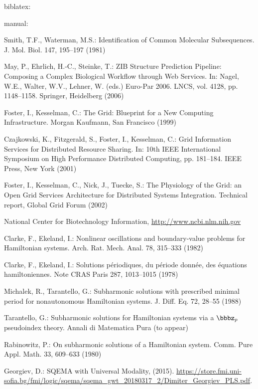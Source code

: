 \documentclass{llncs}
\begin{document}
\nocite{*} biblatex:
\printbibliography

\newpage
manual:
\begin{thebibliography}{10}
Smith, T.F., Waterman, M.S.:
Identification of Common Molecular Subsequences.
J. Mol. Biol. 147, 195--197 (1981)

May, P., Ehrlich, H.-C., Steinke, T.:
ZIB Structure Prediction Pipeline: Composing a Complex Biological Workflow through Web Services.
In: Nagel, W.E., Walter, W.V., Lehner, W. (eds.) Euro-Par 2006.
LNCS, vol. 4128, pp. 1148--1158. Springer, Heidelberg (2006)

Foster, I., Kesselman, C.:
The Grid: Blueprint for a New Computing Infrastructure.
Morgan Kaufmann, San Francisco (1999)

Czajkowski, K., Fitzgerald, S., Foster, I., Kesselman, C.:
Grid Information Services for Distributed Resource Sharing.
In: 10th IEEE International Symposium on High Performance Distributed Computing,
pp. 181--184. IEEE Press, New York (2001)

Foster, I., Kesselman, C., Nick, J., Tuecke, S.:
The Physiology of the Grid:
an Open Grid Services Architecture for Distributed Systems Integration.
Technical report, Global Grid Forum (2002)

National Center for Biotechnology Information,
\url{http://www.ncbi.nlm.nih.gov}

Clarke, F., Ekeland, I.:
Nonlinear oscillations and boundary-value problems for Hamiltonian systems.
Arch. Rat. Mech. Anal. 78, 315--333 (1982)

Clarke, F., Ekeland, I.:
Solutions p\'{e}riodiques, du p\'{e}riode donn\'{e}e, des \'{e}quations hamiltoniennes.
Note CRAS Paris 287, 1013--1015 (1978)

Michalek, R., Tarantello, G.:
Subharmonic solutions with prescribed minimal period for nonautonomous Hamiltonian systems.
J. Diff. Eq. 72, 28--55 (1988)

Tarantello, G.:
Subharmonic solutions for Hamiltonian systems via a $\bbbz_{p}$ pseudoindex theory.
Annali di Matematica Pura (to appear)

Rabinowitz, P.:
On subharmonic solutions of a Hamiltonian system.
Comm. Pure Appl. Math. 33, 609--633 (1980)

Georgiev, D.:
SQEMA with Universal Modality, (2015). \url{https://store.fmi.uni-sofia.bg/fmi/logic/sqema/sqema_gwt_20180317_2/Dimiter_Georgiev_PLS.pdf}.
\end{thebibliography}
\end{document}
